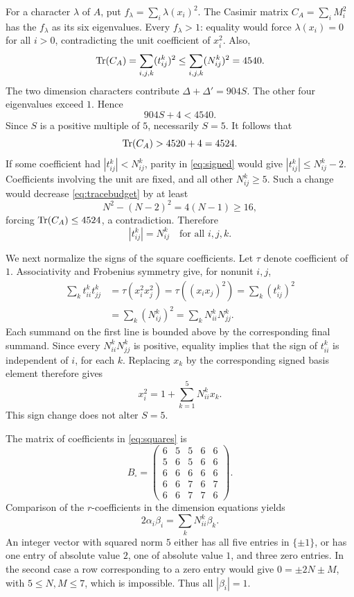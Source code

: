 \documentclass[11pt]{article}
\theoremstyle{remark}\newtheorem{remark}[theorem]{Remark}
\begin{document}
For a character $\lambda$ of $A$, put $f_\lambda=\sum_i\lambda(x_i)^2$. The Casimir matrix $C_A=\sum_iM_i^2$ has the $f_\lambda$ as its six eigenvalues. Every $f_\lambda>1$: equality would force $\lambda(x_i)=0$ for all $i>0$, contradicting the unit coefficient of $x_i^2$. Also,
\begin{equation}\label{eq:tracebudget}
\operatorname{Tr}(C_A)=\sum_{i,j,k}(t_{ij}^k)^2\le\sum_{i,j,k}(N_{ij}^k)^2=4540.
\end{equation}
The two dimension characters contribute $\Delta+\Delta'=904S$. The other four eigenvalues exceed $1$. Hence
\[
904S+4<4540.
\]
Since $S$ is a positive multiple of $5$, necessarily $S=5$. It follows that
\begin{equation}\label{eq:saturation}
\operatorname{Tr}(C_A)>4520+4=4524.
\end{equation}
If some coefficient had $|t_{ij}^k|<N_{ij}^k$, parity in \eqref{eq:signed} would give $|t_{ij}^k|\le N_{ij}^k-2$. Coefficients involving the unit are fixed, and all other $N_{ij}^k\ge5$. Such a change would decrease \eqref{eq:tracebudget} by at least
\[
N^2-(N-2)^2=4(N-1)\ge16,
\]
forcing $\operatorname{Tr}(C_A)\le4524$, a contradiction. Therefore
\begin{equation}\label{eq:nocancellation}
|t_{ij}^k|=N_{ij}^k\quad\text{for all }i,j,k.
\end{equation}

We next normalize the signs of the square coefficients. Let $\tau$ denote coefficient of $1$. Associativity and Frobenius symmetry give, for nonunit $i,j$,
\begin{align*}
\sum_k t_{ii}^kt_{jj}^k
&=\tau(x_i^2x_j^2)=\tau((x_ix_j)^2)
=\sum_k(t_{ij}^k)^2\\
&=\sum_k(N_{ij}^k)^2=\sum_kN_{ii}^kN_{jj}^k.
\end{align*}
Each summand on the first line is bounded above by the corresponding final summand. Since every $N_{ii}^kN_{jj}^k$ is positive, equality implies that the sign of $t_{ii}^k$ is independent of $i$, for each $k$. Replacing $x_k$ by the corresponding signed basis element therefore gives
\begin{equation}\label{eq:squares}
x_i^2=1+\sum_{k=1}^5N_{ii}^kx_k.
\end{equation}
This sign change does not alter $S=5$.

The matrix of coefficients in \eqref{eq:squares} is
\begin{equation}\label{eq:B}
B_\square=\begin{pmatrix}
6&5&5&6&6\\5&6&5&6&6\\6&6&6&6&6\\6&6&7&6&7\\6&6&7&7&6
\end{pmatrix}.
\end{equation}
Comparison of the $r$-coefficients in the dimension equations yields
\[
2\alpha_i\beta_i=\sum_kN_{ii}^k\beta_k.
\]
An integer vector with squared norm $5$ either has all five entries in $\{\pm1\}$, or has one entry of absolute value $2$, one of absolute value $1$, and three zero entries. In the second case a row corresponding to a zero entry would give $0=\pm2N\pm M$, with $5\le N,M\le7$, which is impossible. Thus all $|\beta_i|=1$.
\end{document}
